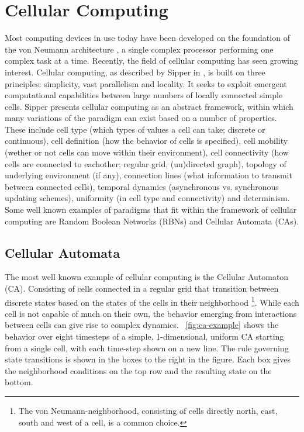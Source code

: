 \section{Cellular Computing}

Most computing devices in use today have been developed on the foundation of the
von Neumann architecture \cite{VonNeumann1993}, a single complex processor
performing one complex task at a time. Recently, the field of cellular computing
has seen growing interest. Cellular computing, as described by Sipper in
\cite{Sipper1999}, is built on three principles: simplicity, vast parallelism
and locality. It seeks to exploit emergent computational capabilities between
large numbers of locally connected simple cells. Sipper presents cellular
computing as an abstract framework, within which many variations of the paradigm
can exist based on a number of properties. These include cell type (which types
of values a cell can take; discrete or continuous), cell definition (how the
behavior of cells is specified), cell mobility (wether or not cells can move
within their environment), cell connectivity (how cells are connected to
eachother; regular grid, (un)directed graph), topology of underlying environment
(if any), connection lines (what information to transmit between connected
cells), temporal dynamics (asynchronous vs. synchronous updating schemes),
uniformity (in cell type and connectivity) and determinism. Some well known
examples of paradigms that fit within the framework of cellular computing are
Random Boolean Networks (RBNs) and Cellular Automata (CAs).

\subsection{Cellular Automata}

The most well known example of cellular computing is the Cellular Automaton
(CA). Consisting of cells connected in a regular grid that transition between
discrete states based on the states of the cells in their neighborhood
\footnote{The von Neumann-neighborhood, consisting of cells directly north,
east, south and west of a cell, is a common choice.}. While each cell is not
capable of much on their own, the behavior emerging from interactions between
cells can give rise to complex dynamics. \figurename~\ref{fig:ca-example} shows
the behavior over eight timesteps of a simple, 1-dimensional, uniform CA
starting from a single cell, with each time-step shown on a new line. The rule
governing state transitions is shown in the boxes to the right in the figure.
Each box gives the neighborhood conditions on the top row and the resulting
state on the bottom.


